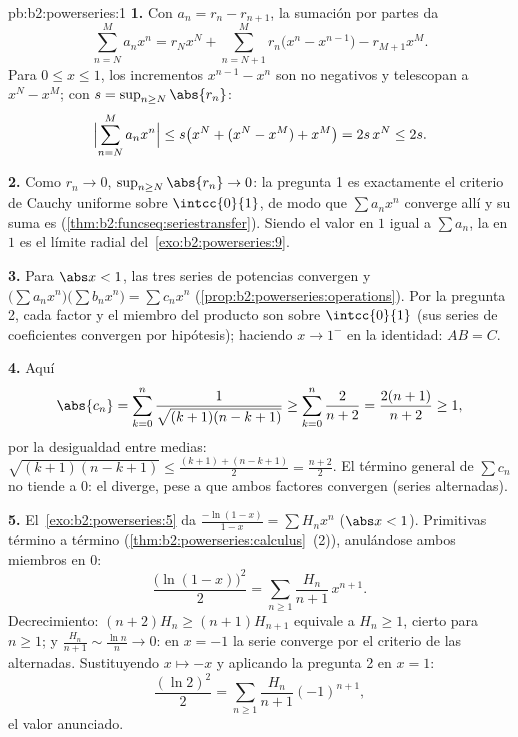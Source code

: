 \begin{solution}{pb:b2:powerseries:1}
\textbf{1.} Con $a_n = r_n - r_{n+1}$, la sumación por partes da
\[
\sum_{n=N}^{M} a_nx^n
= r_Nx^N + \sum_{n=N+1}^{M} r_n\bigl(x^n - x^{n-1}\bigr)
- r_{M+1}x^M .
\]
Para $0 \leq x \leq 1$, los incrementos $x^{n-1} - x^n$ son no
negativos y telescopan a $x^N - x^M$; con $s = \sup_{n\geq
N}\abs{r_n}$:
\[
\Bigl|\sum_{n=N}^{M}a_nx^n\Bigr|
\leq s\bigl(x^N + (x^N - x^M) + x^M\bigr) = 2s\,x^N \leq 2s .
\]

\textbf{2.} Como $r_n \to 0$, $\sup_{n\geq N}\abs{r_n} \to 0$: la
pregunta 1 es exactamente el criterio de Cauchy uniforme sobre
$\intcc{0}{1}$, de modo que $\sum a_nx^n$ converge allí
 y su suma es 
(\cref{thm:b2:funcseq:seriestransfer}). Siendo el valor en $1$
igual a $\sum a_n$, la  en $1$ es el límite radial del~\cref{exo:b2:powerseries:9}.

\textbf{3.} Para $\abs x < 1$, las tres series de potencias
convergen  y $\bigl(\sum a_nx^n\bigr)\bigl(\sum
b_nx^n\bigr) = \sum c_nx^n$
(\cref{prop:b2:powerseries:operations}). Por la pregunta 2, cada
factor y el miembro del producto son  sobre
$\intcc{0}{1}$ (sus series de coeficientes convergen por
hipótesis); haciendo $x \to 1^-$ en la identidad: $AB = C$.

\textbf{4.} Aquí
\[
\abs{c_n} = \sum_{k=0}^{n}
\frac{1}{\sqrt{(k+1)(n-k+1)}}
\geq \sum_{k=0}^{n}\frac{2}{n+2}
= \frac{2(n+1)}{n+2} \geq 1,
\]
por la desigualdad entre medias: $\sqrt{(k+1)(n-k+1)} \leq
\frac{(k+1) + (n-k+1)}{2} = \frac{n+2}{2}$. El término general de
$\sum c_n$ no tiende a $0$: el  diverge, pese a
que ambos factores convergen (series alternadas).

\textbf{5.} El~\cref{exo:b2:powerseries:5} da $\frac{-\ln(1-x)}{1-x}
= \sum H_nx^n$ ($\abs x < 1$). Primitivas término a término
(\cref{thm:b2:powerseries:calculus}~(2)), anulándose ambos miembros
en $0$:
\[
\frac{\bigl(\ln(1-x)\bigr)^2}{2}
= \sum_{n\geq1}\frac{H_n}{n+1}\,x^{n+1} .
\]
Decrecimiento: $(n+2)H_n \geq (n+1)H_{n+1}$ equivale a $H_n \geq
1$, cierto para $n \geq 1$; y $\frac{H_n}{n+1} \sim \frac{\ln n}{n}
\to 0$: en $x = -1$ la serie converge por el criterio de las
alternadas. Sustituyendo $x \mapsto -x$ y aplicando la pregunta 2 en
$x = 1$:
\[
\frac{(\ln 2)^2}{2}
= \sum_{n\geq1}\frac{H_n}{n+1}(-1)^{n+1},
\]
el valor anunciado.


\end{solution}
